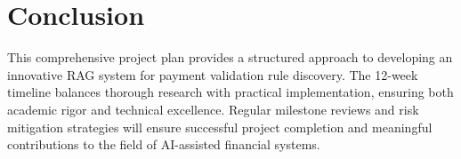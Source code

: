 \documentclass[11pt,a4paper]{article}
\begin{document}
\section{Conclusion}

This comprehensive project plan provides a structured approach to developing an innovative RAG system for payment validation rule discovery. The 12-week timeline balances thorough research with practical implementation, ensuring both academic rigor and technical excellence. Regular milestone reviews and risk mitigation strategies will ensure successful project completion and meaningful contributions to the field of AI-assisted financial systems.
\end{document}
